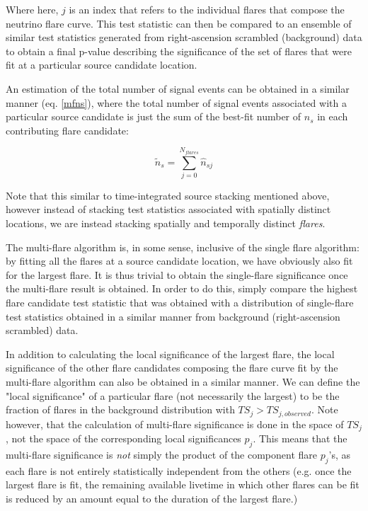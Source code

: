 Where here, $j$ is an index that refers to the individual flares that compose the neutrino flare curve. This test statistic can then be compared to an ensemble of similar test statistics generated from right-ascension scrambled (background) data to obtain a final p-value describing the significance of the set of flares that were fit at a particular source candidate location. 

An estimation of the total number of signal events can be obtained in a similar manner (eq. \ref{mfns}), where the total number of signal events associated with a particular source candidate is just the sum of the best-fit number of $n_s$ in each contributing flare candidate:

\begin{equation}
    \widetilde{n}_s = \sum_{j=0}^{N_{flares}} \hat{n}_{sj}
    \label{mfns}
\end{equation}

Note that this similar to time-integrated source stacking mentioned above, however instead of stacking test statistics associated with spatially distinct locations, we are instead stacking spatially and temporally distinct \textit{flares}.

The multi-flare algorithm is, in some sense, inclusive of the single flare algorithm: by fitting all the flares at a source candidate location, we have obviously also fit for the largest flare. It is thus trivial to obtain the single-flare significance once the multi-flare result is obtained. In order to do this, simply compare the highest flare candidate test statistic that was obtained with a distribution of single-flare test statistics obtained in a similar manner from background (right-ascension scrambled) data. 

In addition to calculating the local significance of the largest flare, the local significance of the other flare candidates composing the flare curve fit by the multi-flare algorithm can also be obtained in a similar manner. We can define the "local significance" of a particular flare (not necessarily the largest) to be the fraction of flares in the background distribution with $TS_j>TS_{j,observed}$. Note however, that the calculation of multi-flare significance is done in the space of $TS_j$, not the space of the corresponding local significances $p_j$. This means that the multi-flare significance is \textit{not} simply the product of the component flare $p_j$'s, as each flare is not entirely statistically independent from the others (e.g. once the largest flare is fit, the remaining available livetime in which other flares can be fit is reduced by an amount equal to the duration of the largest flare.) 

